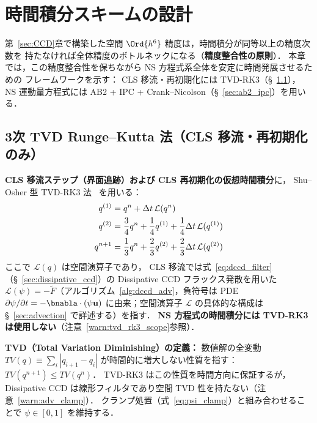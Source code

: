 %
\section{時間積分スキームの設計}
\label{sec:time_int}

第~\ref{sec:CCD}章で構築した空間 $\Ord{h^6}$ 精度は，時間積分が同等以上の精度次数を
持たなければ全体精度のボトルネックになる（\textbf{精度整合性の原則}）．
本章では，この精度整合性を保ちながら NS 方程式系全体を安定に時間発展させるための
フレームワークを示す：
CLS 移流・再初期化には TVD-RK3（§~\ref{sec:tvd_rk3}），
NS 運動量方程式には AB2 + IPC + Crank--Nicolson（§~\ref{sec:ab2_ipc}）を用いる．

\subsection{3次 TVD Runge--Kutta 法（CLS 移流・再初期化のみ）}
\label{sec:tvd_rk3}

\textbf{CLS 移流ステップ（界面追跡）および CLS 再初期化の仮想時間積分}に，
Shu--Osher 型 TVD-RK3 法~\cite{ShuOsher1988} を用いる：
\begin{align}
  q^{(1)} &= q^n + \Delta t \, \mathcal{L}(q^n) \notag\\
  q^{(2)} &= \frac{3}{4}q^n + \frac{1}{4}q^{(1)} + \frac{1}{4}\Delta t\,\mathcal{L}(q^{(1)}) \notag\\
  q^{n+1} &= \frac{1}{3}q^n + \frac{2}{3}q^{(2)} + \frac{2}{3}\Delta t\,\mathcal{L}(q^{(2)})
  \label{eq:tvd_rk3}
\end{align}
ここで $\mathcal{L}(q)$ は空間演算子であり，
CLS 移流では式~\eqref{eq:dccd_filter}（§~\ref{sec:dissipative_ccd}）の Dissipative CCD フラックス発散を用いた
$\mathcal{L}(\psi) = -\tilde{F}$（アルゴリズム~\ref{alg:dccd_adv}，負符号は PDE $\partial\psi/\partial t = -\bnabla\cdot(\psi\mathbf{u})$ に由来；空間演算子 $\mathcal{L}$ の具体的な構成は §~\ref{sec:advection} で詳述する）を指す．
\textbf{NS 方程式の時間積分には TVD-RK3 は使用しない}（注意~\ref{warn:tvd_rk3_scope}参照）．

\noindent\textbf{TVD（Total Variation Diminishing）の定義：}
数値解の全変動
$TV(q) \equiv \sum_i |q_{i+1} - q_i|$ が時間的に増大しない性質を指す：
$TV(q^{n+1}) \leq TV(q^n)$．
TVD-RK3 はこの性質を時間方向に保証するが，
Dissipative CCD は線形フィルタであり空間 TVD 性を持たない（注意~\ref{warn:adv_clamp}）．
クランプ処置（式~\eqref{eq:psi_clamp}）と組み合わせることで
$\psi \in [0,1]$ を維持する．

